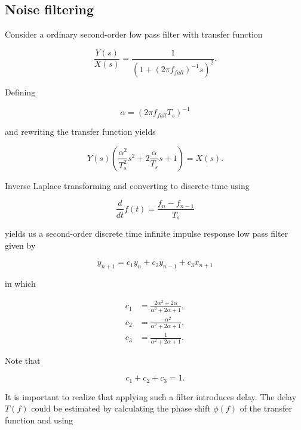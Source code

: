 \documentclass[11pt,titlepage]{report}
\begin{document}
\begin{appendices}
\section{Noise filtering}

Consider a ordinary second-order low pass filter with transfer function

\begin{equation}
	\frac{Y(s)}{X(s)}=\frac{1}{(1+(2 \pi f_{fall})^{-1} s)^2}.
\end{equation}

Defining

\begin{equation}
	\alpha = (2 \pi f_{fall} T_s)^{-1}
\end{equation}

and rewriting the transfer function yields

\begin{equation}
	Y(s) \left(\frac{\alpha^2}{T_s^2} s^2 + 2 \frac{\alpha}{T_s} s + 1 \right) = X(s).
\end{equation}

Inverse Laplace transforming and converting to discrete time using

\begin{equation}
	\frac{d}{dt}f(t) = \frac{f_n - f_{n-1}}{T_s}
\end{equation}

yields us a second-order discrete time infinite impulse response low pass filter given by

\begin{equation}
	y_{n+1} = c_1 y_n + c_2 y_{n-1} + c_3 x_{n+1}
\end{equation}

in which

\begin{align}
	c_1 &= \frac{2 \alpha^2 + 2 \alpha}{\alpha^2 + 2 \alpha + 1}, \\
	c_2 &= \frac{-\alpha^2}{\alpha^2 + 2 \alpha + 1}, \\
	c_3 &= \frac{1}{\alpha^2+2 \alpha + 1}.
\end{align}

Note that

\begin{equation}
	c_1 + c_2 + c_3 = 1.
\end{equation}

It is important to realize that applying such a filter introduces delay. The delay $T(f)$ could be estimated by calculating the phase shift $\phi(f)$ of the transfer function and using


\end{appendices}
\end{document}
